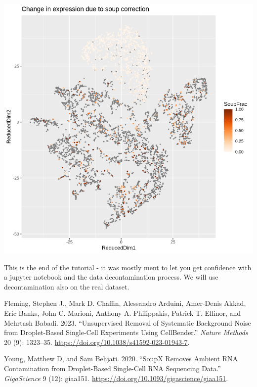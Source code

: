 \documentclass[
  letterpaper,
  DIV=11,
  numbers=noendperiod]{scrartcl}
\newlength{\cslhangindent}
\newenvironment{CSLReferences}[2] %
 {\begin{list}{}{%
  \setlength{\itemindent}{0pt}
  \setlength{\leftmargin}{0pt}
  \setlength{\parsep}{0pt}
  \ifodd #1
   \setlength{\leftmargin}{\cslhangindent}
   \setlength{\itemindent}{-1\cslhangindent}
  \fi
  \setlength{\itemsep}{#2\baselineskip}}}
 {\end{list}}
\begin{document}
\includegraphics{Cleaningthedata.source_files/figure-pdf/cell-4-output-1.png}

\begin{tcolorbox}[enhanced jigsaw, bottomrule=.15mm, arc=.35mm, coltitle=black, colback=white, opacityback=0, colframe=quarto-callout-note-color-frame, toptitle=1mm, opacitybacktitle=0.6, breakable, colbacktitle=quarto-callout-note-color!10!white, toprule=.15mm, bottomtitle=1mm, left=2mm, titlerule=0mm, title=\textcolor{quarto-callout-note-color}{\faInfo}\hspace{0.5em}{Wrapping Up}, leftrule=.75mm, rightrule=.15mm]

This is the end of the tutorial - it was mostly ment to let you get
confidence with a jupyter notebook and the data decontamination process.
We will use decontamination also on the real dataset.

\end{tcolorbox}

\label{refs}
\begin{CSLReferences}{1}{0}
Fleming, Stephen J., Mark D. Chaffin, Alessandro Arduini, Amer-Denis
Akkad, Eric Banks, John C. Marioni, Anthony A. Philippakis, Patrick T.
Ellinor, and Mehrtash Babadi. 2023. {``Unsupervised Removal of
Systematic Background Noise from Droplet-Based Single-Cell Experiments
Using {CellBender}.''} \emph{Nature Methods} 20 (9): 1323--35.
\url{https://doi.org/10.1038/s41592-023-01943-7}.

Young, Matthew D, and Sam Behjati. 2020. {``{SoupX} Removes Ambient
{RNA} Contamination from Droplet-Based Single-Cell {RNA} Sequencing
Data.''} \emph{GigaScience} 9 (12): giaa151.
\url{https://doi.org/10.1093/gigascience/giaa151}.

\end{CSLReferences}
\end{document}
